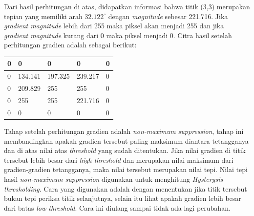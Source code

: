 \noindent Dari hasil perhitungan di atas, didapatkan informasi bahwa titik (3,3) merupakan tepian yang memiliki arah $32.122^\circ$ dengan \textit{magnitude} sebesar 221.716. Jika \textit{gradient magnitude} lebih dari 255 maka piksel akan menjadi 255 dan jika \textit{gradient magnitude} kurang dari 0 maka piksel menjadi 0. Citra hasil setelah perhitungan gradien adalah sebagai berikut:
\begin{table}[H]
	\centering
	\begin{small}
		\begin{tabular}{|p{2cm}|p{2cm}|p{2cm}|p{2cm}|p{2cm}|}
			\hline
			0 & 0 & 0 & 0 & 0 \\
			\hline
			0 & 134.141 & 197.325 & 239.217 & 0 \\
			\hline
			0 & 209.829 & 255 & 255 & 0 \\
			\hline
			0 & 255 & 255 & 221.716 & 0 \\
			\hline
			0 & 0 & 0 & 0 & 0 \\
			\hline
		\end{tabular}
	\end{small}
	\label{fig:MatriksCitraHasilPerhitunganGradien}
\end{table}
\noindent Tahap setelah perhitungan gradien adalah \textit{non-maximum suppression}, tahap ini membandingkan apakah gradien tersebut paling maksimum diantara tetangganya dan di atas nilai atas \textit{threshold} yang sudah ditentukan. Jika nilai gradien di titik tersebut lebih besar dari \textit{high threshold} dan merupakan nilai maksimum dari gradien-gradien tetangganya, maka nilai tersebut merupakan nilai tepi. Nilai tepi hasil \textit{non-maximum suppression} digunakan untuk menghitung \textit{Hysterysis thresholding}. Cara yang digunakan adalah dengan menentukan jika titik tersebut bukan tepi periksa titik selanjutnya, selain itu lihat apakah gradien lebih besar dari batas \textit{low threshold}. Cara ini diulang sampai tidak ada lagi perubahan.\\

